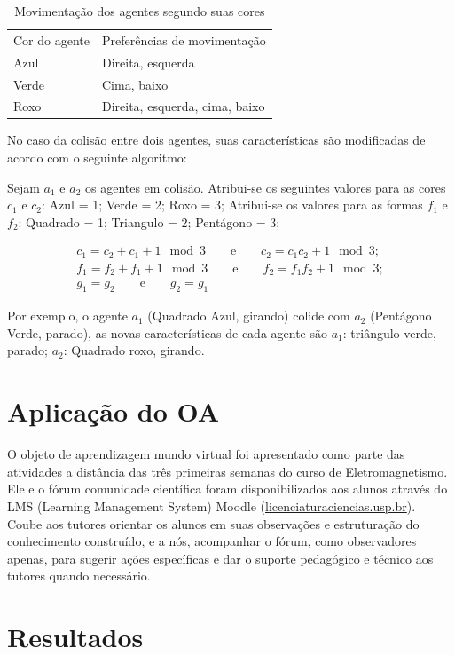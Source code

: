 \documentclass{article}
\begin{document}
\begin{table}
	\caption{Movimentação dos agentes segundo suas cores}
	\label{tab:cor-vs-movimentacao}
	\begin{tabular}{ll}
		Cor do agente & Preferências de movimentação \\
		Azul          & Direita, esquerda \\
		Verde         & Cima, baixo \\
		Roxo          & Direita, esquerda, cima, baixo
	\end{tabular}
\end{table}

No caso da colisão entre dois agentes, suas características são modificadas de
acordo com o seguinte algoritmo:

Sejam $a_1$ e $a_2$ os agentes em colisão. Atribui-se os seguintes valores para as cores $c_1$ e $c_2$: Azul = 1; Verde = 2; Roxo = 3;
Atribui-se os valores para as formas $f_1$ e $f_2$: Quadrado = 1; Triangulo = 2; Pentágono = 3;

\begin{gather}
c_1 = c_2 + c_1 + 1 \mod 3 \qquad\text{e}\qquad c_2 = c_1 c_2 + 1 \mod 3;\\
f_1 = f_2 + f_1 + 1 \mod 3 \qquad\text{e}\qquad f_2 = f_1 f_2 + 1 \mod 3;\\
g_1 = g_2 \qquad\text{e}\qquad g_2 = g_1
\end{gather}

Por exemplo, o agente $a_1$ (Quadrado Azul, girando) colide com $a_2$ (Pentágono Verde, parado),
as novas características de cada agente são $a_1$: triângulo verde, parado;
$a_2$: Quadrado roxo, girando. %

\section{Aplicação do OA}

O objeto de aprendizagem mundo virtual foi apresentado como parte das atividades
a distância das três primeiras semanas do curso de Eletromagnetismo. Ele e o fórum
comunidade científica foram disponibilizados aos alunos através do LMS (Learning
Management System) Moodle (\url{licenciaturaciencias.usp.br}). Coube aos tutores orientar
os alunos em suas observações e estruturação do conhecimento construído, e a nós,
acompanhar o fórum, como observadores apenas, para sugerir ações específicas e dar o
suporte pedagógico e técnico aos tutores quando necessário.

\section{Resultados}
\end{document}
